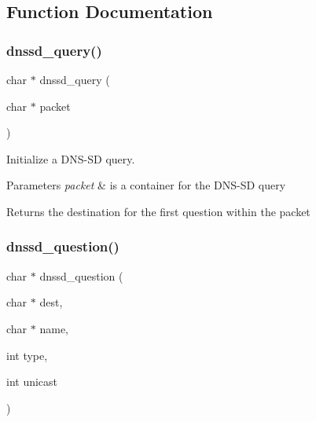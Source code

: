 \subsection{Function Documentation}
\mbox{\label{group__dnssd__client_ga8f7a5f9ac12499f257a2246565d08594}} 
\subsubsection{\texorpdfstring{dnssd\+\_\+query()}{dnssd\_query()}}
{\footnotesize\ttfamily char $\ast$ dnssd\+\_\+query (\begin{DoxyParamCaption}\item[{char $\ast$}]{packet }\end{DoxyParamCaption})}



Initialize a D\+N\+S-\/\+SD query. 


\begin{DoxyParams}{Parameters}
{\em packet} & is a container for the D\+N\+S-\/\+SD query \\
\hline
\end{DoxyParams}
\begin{DoxyReturn}{Returns}
the destination for the first question within the packet 
\end{DoxyReturn}
\mbox{\label{group__dnssd__client_ga5bd74cd3f020394cb9b4df715fc18872}} 
\subsubsection{\texorpdfstring{dnssd\+\_\+question()}{dnssd\_question()}}
{\footnotesize\ttfamily char $\ast$ dnssd\+\_\+question (\begin{DoxyParamCaption}\item[{char $\ast$}]{dest,  }\item[{char $\ast$}]{name,  }\item[{int}]{type,  }\item[{int}]{unicast }\end{DoxyParamCaption})}



